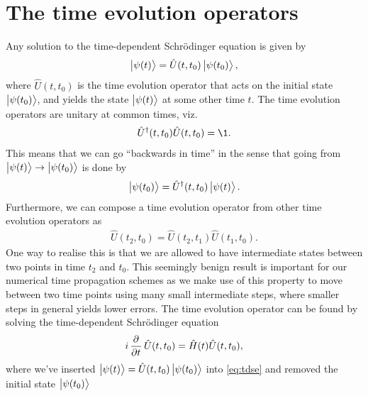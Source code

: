     \section{The time evolution operators}
        \label{sec:time-evolution-operators}
        Any solution to the time-dependent Schrödinger equation is given by
        \begin{align}
            \ket{\psi(t)} = \hat{U}(t, t_0)\ket{\psi(t_0)},
        \end{align}
        where $\hat{U}(t, t_0)$ is the time evolution operator that acts on the
        initial state $\ket{\psi(t_0)}$, and yields the state $\ket{\psi(t)}$ at
        some other time $t$.
        The time evolution operators are unitary at common times, viz.
        \begin{align}
            \hat{U}^{\dagger}(t, t_0)\hat{U}(t, t_0) = \1.
        \end{align}
        This means that we can go ``backwards in time'' in the sense that going
        from $\ket{\psi(t)} \to \ket{\psi(t_0)}$ is done by
        \begin{align}
            \ket{\psi(t_0)} = \hat{U}^{\dagger}(t, t_0)\ket{\psi(t)}.
        \end{align}
        Furthermore, we can compose a time evolution operator from other time
        evolution operators as
        \begin{align}
            \hat{U}(t_2, t_0) = \hat{U}(t_2, t_1)\hat{U}(t_1, t_0).
        \end{align}
        One way to realise this is that we are allowed to have intermediate
        states between two points in time $t_2$ and $t_0$.
        This seemingly benign result is important for our numerical time
        propagation schemes as we make use of this property to move between
        two time points using many small intermediate steps, where smaller steps
        in general yields lower errors.
        The time evolution operator can be found by solving the time-dependent
        Schrödinger equation
        \begin{gather}
            i\dpd{}{t}\hat{U}(t, t_0) = \hamil(t)\hat{U}(t, t_0),
        \end{gather}
        where we've inserted $\ket{\psi(t)} = \hat{U}(t, t_0)\ket{\psi(t_0)}$
        into \autoref{eq:tdse} and removed the initial state $\ket{\psi(t_0)}$
